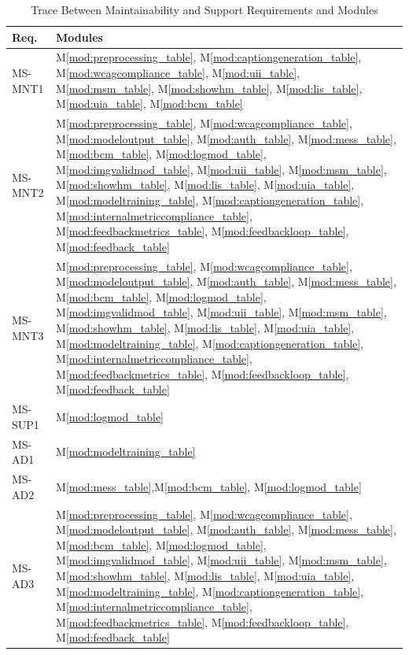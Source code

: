 \documentclass[12pt, titlepage]{article}
\newcommand{\mref}[1]{M\ref{#1}}
\begin{document}
\begin{table}[H]
  \caption{Trace Between Maintainability and Support Requirements and Modules}
  \label{TblMSRT}
  \centering
  \small
  \begin{tabularx}{\textwidth}{>{\RaggedRight\arraybackslash}p{}Y}
    \toprule
    \textbf{Req.} & \textbf{Modules}\\
    \midrule
    MS-MNT1 & \mref{mod:preprocessing_table},
    \mref{mod:captiongeneration_table},
    \mref{mod:wcagcompliance_table}, \mref{mod:uii_table},
    \mref{mod:msm_table}, \mref{mod:showhm_table},
    \mref{mod:lis_table}, \mref{mod:uia_table}, \mref{mod:bcm_table}\\
    MS-MNT2 & \mref{mod:preprocessing_table},
    \mref{mod:wcagcompliance_table}, \mref{mod:modeloutput_table},
    \mref{mod:auth_table}, \mref{mod:mess_table},
    \mref{mod:bcm_table}, \mref{mod:logmod_table},
    \mref{mod:imgvalidmod_table}, \mref{mod:uii_table},
    \mref{mod:msm_table},  \mref{mod:showhm_table},
    \mref{mod:lis_table}, \mref{mod:uia_table}, \mref{mod:modeltraining_table},
    \mref{mod:captiongeneration_table},
    \mref{mod:internalmetriccompliance_table}, \mref{mod:feedbackmetrics_table},
    \mref{mod:feedbackloop_table}, \mref{mod:feedback_table}\\
    MS-MNT3 & \mref{mod:preprocessing_table},
    \mref{mod:wcagcompliance_table}, \mref{mod:modeloutput_table},
    \mref{mod:auth_table}, \mref{mod:mess_table},
    \mref{mod:bcm_table}, \mref{mod:logmod_table},
    \mref{mod:imgvalidmod_table}, \mref{mod:uii_table},
    \mref{mod:msm_table},  \mref{mod:showhm_table},
    \mref{mod:lis_table}, \mref{mod:uia_table}, \mref{mod:modeltraining_table},
    \mref{mod:captiongeneration_table},
    \mref{mod:internalmetriccompliance_table}, \mref{mod:feedbackmetrics_table},
    \mref{mod:feedbackloop_table}, \mref{mod:feedback_table}\\
    MS-SUP1 & \mref{mod:logmod_table}\\
    MS-AD1 & \mref{mod:modeltraining_table}\\
    MS-AD2 &  \mref{mod:mess_table},\mref{mod:bcm_table},
    \mref{mod:logmod_table}\\
    MS-AD3 & \mref{mod:preprocessing_table},
    \mref{mod:wcagcompliance_table}, \mref{mod:modeloutput_table},
    \mref{mod:auth_table}, \mref{mod:mess_table},
    \mref{mod:bcm_table}, \mref{mod:logmod_table},
    \mref{mod:imgvalidmod_table}, \mref{mod:uii_table},
    \mref{mod:msm_table},  \mref{mod:showhm_table},
    \mref{mod:lis_table}, \mref{mod:uia_table}, \mref{mod:modeltraining_table},
    \mref{mod:captiongeneration_table},
    \mref{mod:internalmetriccompliance_table}, \mref{mod:feedbackmetrics_table},
    \mref{mod:feedbackloop_table}, \mref{mod:feedback_table}\\
    \bottomrule
  \end{tabularx}
\end{table}
\end{document}
